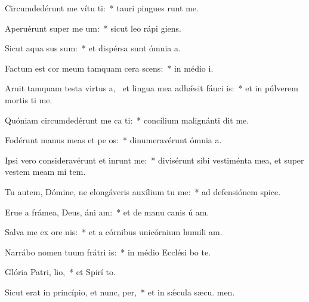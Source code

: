 \item Circumdedérunt me vítu ti:~* tauri pingues runt me.
\item Aperuérunt super me  um:~* sicut leo rápi  giens.
\item Sicut aqua sus sum:~* et dispérsa sunt ómnia  a.
\item Factum est cor meum tamquam cera scens:~* in médio  i.
\item Aruit tamquam testa virtus a,~\pscross{} et lingua mea adhǽsit fáuci is:~* et in púlverem mortis ti me.
\item Quóniam circumdedérunt me ca ti:~* concílium malignánti dit me.
\item Fodérunt manus meas et pe os:~* dinumeravérunt ómnia  a.
\item Ipsi vero consideravérunt et inrunt me:~* divisérunt sibi vestiménta mea, et super vestem meam mi tem.
\item Tu autem, Dómine, ne elongáveris auxílium tu  me:~* ad defensiónem  spice.
\item Erue a frámea, Deus, áni am:~* et de manu canis ú am.
\item Salva me ex ore nis:~* et a córnibus unicórnium humili am.
\item Narrábo nomen tuum frátri is:~* in médio Ecclési bo te.
\item Glória Patri,  lio,~* et Spirí to.
\item Sicut erat in princípio, et nunc,  per,~* et in sǽcula sæcu. men.
